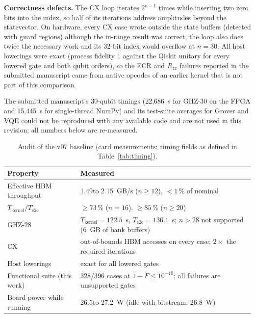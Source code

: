 \documentclass[pdflatex,sn-mathphys-num]{sn-jnl}
\newcommand{\NumSuitePassVseven}{328}
\newcommand{\NumSuiteThrVseven}{10^{-10}}
\newcommand{\NumSuiteTotalVseven}{396}
\newcommand{\NumVsevenBwMax}{2.15}
\newcommand{\NumVsevenBwMin}{1.49}
\newcommand{\NumVsevenGhzTwentyEightEtoE}{136.1}
\newcommand{\NumVsevenGhzTwentyEightKernel}{122.5}
\newcommand{\NumVsevenKernelFracMin}{73}
\newcommand{\NumVsevenKernelFracMinTwenty}{85}
\newcommand{\NumVsevenPowerIdle}{26.8}
\newcommand{\NumVsevenPowerMax}{27.2}
\newcommand{\NumVsevenPowerMin}{26.5}
\theoremstyle{thmstyleone}
\theoremstyle{thmstylethree}
\begin{document}
\textbf{Correctness defects.} The CX loop iterates $2^{n-1}$ times while inserting two zero bits into the index, so half of its iterations address amplitudes beyond the statevector. On hardware, every CX case wrote outside the state buffers (detected with guard regions) although the in-range result was correct; the loop also does twice the necessary work and its 32-bit index would overflow at $n=30$. All host lowerings were exact (process fidelity 1 against the Qiskit unitary for every lowered gate and both qubit orders), so the ECR and $R_{zz}$ failures reported in the submitted manuscript came from native opcodes of an earlier kernel that is not part of this comparison.

The submitted manuscript's 30-qubit timings (22{,}686~s for GHZ-30 on the FPGA and 15{,}445~s for single-thread NumPy) and its test-suite averages for Grover and VQE could not be reproduced with any available code and are not used in this revision; all numbers below are re-measured.

\begin{table}
\centering
\caption{Audit of the v07 baseline (card measurements; timing fields as defined in Table~\ref{tab:timing}).}\label{tab:v07}
\small
\begin{tabular}{lp{7.6cm}}
\toprule
Property & Measured \\
\midrule
Effective HBM throughput & \NumVsevenBwMin to \NumVsevenBwMax~GB/s ($n\geq 12$), $<1\,\%$ of nominal \\
$T_\mathrm{kernel}/T_\mathrm{e2e}$ & $\geq\NumVsevenKernelFracMin\,\%$ ($n=16$), $\geq\NumVsevenKernelFracMinTwenty\,\%$ ($n\geq 20$) \\
GHZ-28 & $T_\mathrm{kernel}=\NumVsevenGhzTwentyEightKernel$~s, $T_\mathrm{e2e}=\NumVsevenGhzTwentyEightEtoE$~s; $n>28$ not supported (6~GB of bank buffers) \\
CX & out-of-bounds HBM accesses on every case; $2\times$ the required iterations \\
Host lowerings & exact for all lowered gates \\
Functional suite (this work) & \NumSuitePassVseven/\NumSuiteTotalVseven{} cases at $1-F\leq\NumSuiteThrVseven$; all failures are unsupported gates \\
Board power while running & \NumVsevenPowerMin to \NumVsevenPowerMax~W (idle with bitstream: \NumVsevenPowerIdle~W) \\
\bottomrule
\end{tabular}
\end{table}
\end{document}
